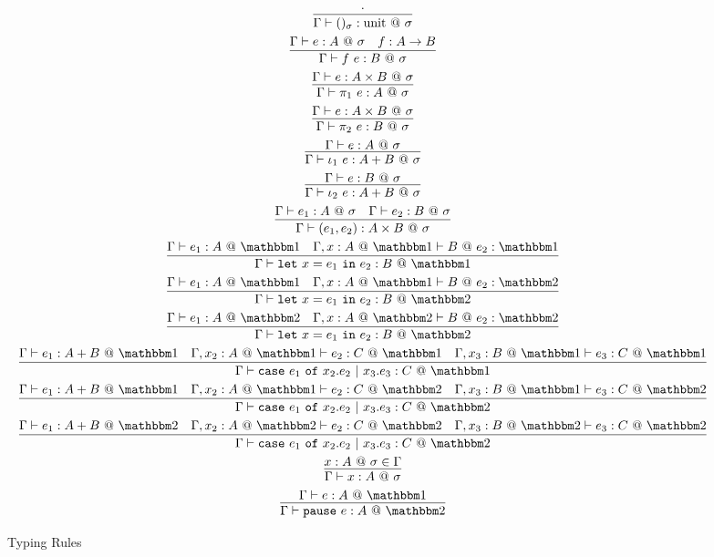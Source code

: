 \documentclass[11pt]{article}
\makeatletter
\newcommand {\bbone} {\mathbbm 1}
\newcommand {\bbtwo} {\mathbbm 2}
\newcommand {\at} {{\tt~@~}}
\newcommand {\pause} {{\tt pause}}
\newcommand {\letin} [3] {{\tt let}~{#1} = {#2}~{\tt in}~{#3}}
\newcommand {\caseof} [3] {{\tt case}~{#1} ~{\tt of}~{#2}~{\tt |}~{#3}}
\newcommand {\inferenceSpacing}{\setlength{\jot}{1.8ex}}
\makeatother
\begin{document}
\begin{figure}
\caption{Typing Rules}
\label{fig:staging}
\inferenceSpacing
\begin{gather}
\infer {\Gamma\vdash ()_\sigma : \text{unit}\at\sigma}{\cdot} \\
\infer {\Gamma\vdash f~e : B\at\sigma}{\Gamma\vdash e : A\at\sigma & f : A \to B} \\
\infer {\Gamma\vdash \pi_1~e : A \at \sigma}{\Gamma\vdash e : A\times B \at \sigma} \\
\infer {\Gamma\vdash \pi_2~e : B \at \sigma}{\Gamma\vdash e : A\times B \at \sigma} \\
\infer {\Gamma\vdash \iota_1~e : A+B\at\sigma}{\Gamma\vdash e : A\at\sigma} \\
\infer {\Gamma\vdash \iota_2~e : A+B\at\sigma}{\Gamma\vdash e : B\at\sigma} \\
\infer {\Gamma\vdash (e_1,e_2) : A\times B \at \sigma}{\Gamma\vdash e_1 : A \at \sigma & \Gamma\vdash e_2 : B \at \sigma} \\
\infer {\Gamma\vdash \letin {x}{e_1}{e_2} : B \at \bbone}{\Gamma\vdash e_1 : A \at \bbone & \Gamma,x:A \at \bbone \vdash B\at e_2 : \bbone} \\
\infer {\Gamma\vdash \letin {x}{e_1}{e_2} : B \at \bbtwo}{\Gamma\vdash e_1 : A \at \bbone & \Gamma,x:A \at \bbone \vdash B\at e_2 : \bbtwo} \\
\infer {\Gamma\vdash \letin {x}{e_1}{e_2} : B \at \bbtwo}{\Gamma\vdash e_1 : A \at \bbtwo & \Gamma,x:A \at \bbtwo \vdash B\at e_2 : \bbtwo} \\
\infer {\Gamma\vdash \caseof {e_1}{x_2.e_2}{x_3.e_3} : C\at\bbone}{\Gamma\vdash e_1 : A+B\at\bbone & \Gamma,x_2:A\at\bbone \vdash e_2 : C\at\bbone & \Gamma,x_3:B\at\bbone \vdash e_3 : C\at\bbone} \\
\infer {\Gamma\vdash \caseof {e_1}{x_2.e_2}{x_3.e_3} : C\at\bbtwo}{\Gamma\vdash e_1 : A+B\at\bbone & \Gamma,x_2:A\at\bbone \vdash e_2 : C\at\bbtwo & \Gamma,x_3:B\at\bbone \vdash e_3 : C\at\bbtwo} \\
\infer {\Gamma\vdash \caseof {e_1}{x_2.e_2}{x_3.e_3} : C\at\bbtwo}{\Gamma\vdash e_1 : A+B\at\bbtwo & \Gamma,x_2:A\at\bbtwo \vdash e_2 : C\at\bbtwo & \Gamma,x_3:B\at\bbtwo \vdash e_3 : C\at\bbtwo} \\
\infer {\Gamma\vdash x : A\at\sigma}{x : A\at\sigma \in \Gamma} \\
\infer {\Gamma\vdash \pause~e : A\at\bbtwo}{\Gamma\vdash e : A\at\bbone}
\end{gather}
\end{figure}
\end{document}
